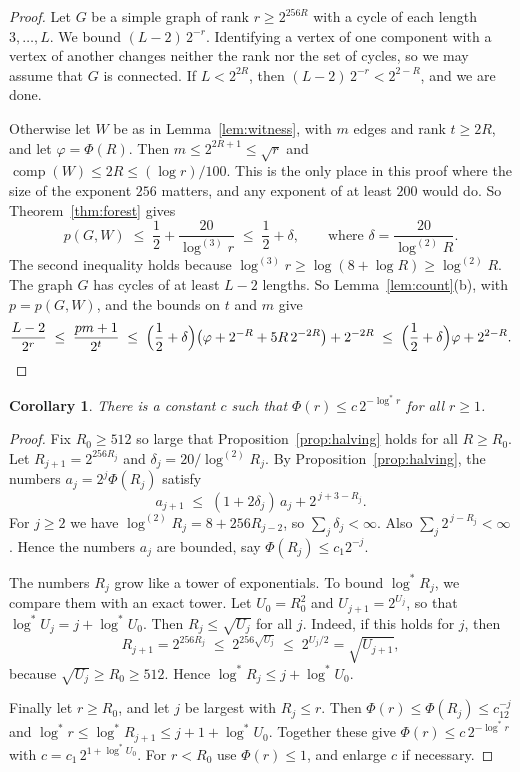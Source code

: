 \documentclass[11pt]{article}
\newtheorem{corollary}[theorem]{Corollary}
\theoremstyle{definition}
\theoremstyle{remark}
\newcommand{\comp}{\operatorname{comp}}
\newcommand{\lgs}{\log^{*}}
\newcommand{\lgk}[1]{\log^{(#1)}}
\numberwithin{equation}{section}
\begin{document}
\begin{proof}
Let $G$ be a simple graph of rank $r\ge2^{256R}$ with a cycle of each length $3,\dots,L$. We bound
$(L-2)\,2^{-r}$. Identifying a vertex of one component with a vertex of another changes neither the
rank nor the set of cycles, so we may assume that $G$ is connected. If $L<2^{2R}$, then
$(L-2)\,2^{-r}<2^{2-R}$, and we are done.

Otherwise let $W$ be as in Lemma~\ref{lem:witness}, with $m$ edges and rank $t\ge2R$, and let
$\varphi=\Phi(R)$. Then $m\le2^{2R+1}\le\sqrt r$ and $\comp(W)\le2R\le(\log r)/100$. This is
the only place in this proof where the size of the exponent $256$ matters, and any exponent of at
least $200$ would do.
So Theorem~\ref{thm:forest} gives
\[
  p(G,W)\;\le\;\frac12+\frac{20}{\lgk3r}\;\le\;\frac12+\delta,
  \qquad\text{where }\delta=\frac{20}{\lgk2R}.
\]
The second inequality holds because $\lgk3r\ge\log(8+\log R)\ge\lgk2R$. The graph $G$ has cycles of
at least $L-2$ lengths. So Lemma~\ref{lem:count}(b), with $p=p(G,W)$, and the bounds on $t$ and $m$
give
\[
  \frac{L-2}{2^{r}}\;\le\;\frac{pm+1}{2^{t}}
  \;\le\;\Bigl(\frac12+\delta\Bigr)\bigl(\varphi+2^{-R}+5R\,2^{-2R}\bigr)+2^{-2R}
  \;\le\;\Bigl(\frac12+\delta\Bigr)\varphi+2^{2-R}.\qedhere
\]
\end{proof}

\begin{corollary}\label{cor:phi}
There is a constant $c$ such that $\Phi(r)\le c\,2^{-\lgs r}$ for all $r\ge1$.
\end{corollary}

\begin{proof}
Fix $R_0\ge512$ so large that Proposition~\ref{prop:halving} holds for all $R\ge R_0$. Let
$R_{j+1}=2^{256R_j}$ and $\delta_j=20/\lgk2R_j$. By Proposition~\ref{prop:halving}, the numbers
$a_j=2^{j}\Phi(R_j)$ satisfy
\[
  a_{j+1}\;\le\;(1+2\delta_j)\,a_j+2^{\,j+3-R_j}.
\]
For $j\ge2$ we have $\lgk2R_j=8+256R_{j-2}$, so $\sum_j\delta_j<\infty$. Also
$\sum_j2^{\,j-R_j}<\infty$. Hence the numbers $a_j$ are bounded, say $\Phi(R_j)\le c_1 2^{-j}$.

The numbers $R_j$ grow like a tower of exponentials. To bound $\lgs R_j$, we compare them with an
exact tower. Let $U_0=R_0^2$ and $U_{j+1}=2^{U_j}$, so that $\lgs U_j=j+\lgs U_0$. Then
$R_j\le\sqrt{U_j}$ for all $j$. Indeed, if this holds for $j$, then
\[
  R_{j+1}=2^{256R_j}\;\le\;2^{256\sqrt{U_j}}\;\le\;2^{U_j/2}=\sqrt{U_{j+1}},
\]
because $\sqrt{U_j}\ge R_0\ge512$. Hence $\lgs R_j\le j+\lgs U_0$.

Finally let $r\ge R_0$, and let $j$ be largest with $R_j\le r$. Then
$\Phi(r)\le\Phi(R_j)\le c_12^{-j}$ and $\lgs r\le\lgs R_{j+1}\le j+1+\lgs U_0$. Together these give
$\Phi(r)\le c\,2^{-\lgs r}$ with $c=c_1\,2^{1+\lgs U_0}$. For $r<R_0$ use $\Phi(r)\le1$, and enlarge
$c$ if necessary.
\end{proof}
\end{document}
